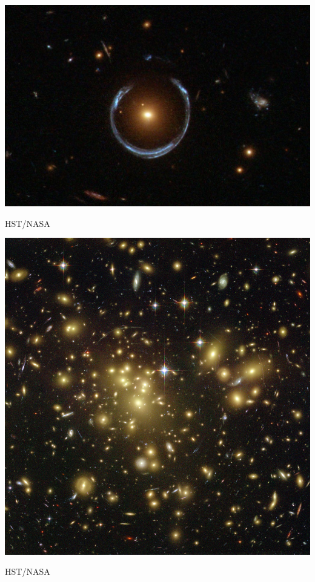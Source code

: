 \documentclass{beamer}
\begin{document}
\frame
{
            \begin{center}
                \includegraphics[width=\textwidth]{A_Horseshoe_Einstein_Ring_from_Hubble.JPG}
            \end{center}
            {\tiny HST/NASA}

    
}
\frame
{
            \begin{center}
                \includegraphics[height=\textheight]{abell-1689-hubble.jpg}
            \end{center}
            {\tiny HST/NASA}

    
}
\end{document}
